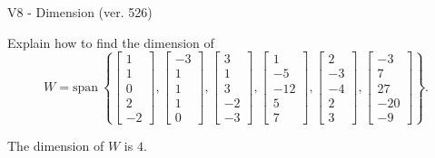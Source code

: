 \begin{exercise}
  \begin{exerciseTitle}V8 - Dimension (ver. 526)\end{exerciseTitle}
  \begin{exerciseStatement}
    Explain how to find the dimension of 
\[W=\mathrm{span}\ \left\{\left[\begin{array}{r}
1 \\
1 \\
0 \\
2 \\
-2
\end{array}\right] , \left[\begin{array}{r}
-3 \\
1 \\
1 \\
1 \\
0
\end{array}\right] , \left[\begin{array}{r}
3 \\
1 \\
3 \\
-2 \\
-3
\end{array}\right] , \left[\begin{array}{r}
1 \\
-5 \\
-12 \\
5 \\
7
\end{array}\right] , \left[\begin{array}{r}
2 \\
-3 \\
-4 \\
2 \\
3
\end{array}\right] , \left[\begin{array}{r}
-3 \\
7 \\
27 \\
-20 \\
-9
\end{array}\right]\right\}.\]



  \end{exerciseStatement}
  \begin{exerciseAnswer}
   The dimension of \(W\) is  \(4\).
  


  \end{exerciseAnswer}
\end{exercise}